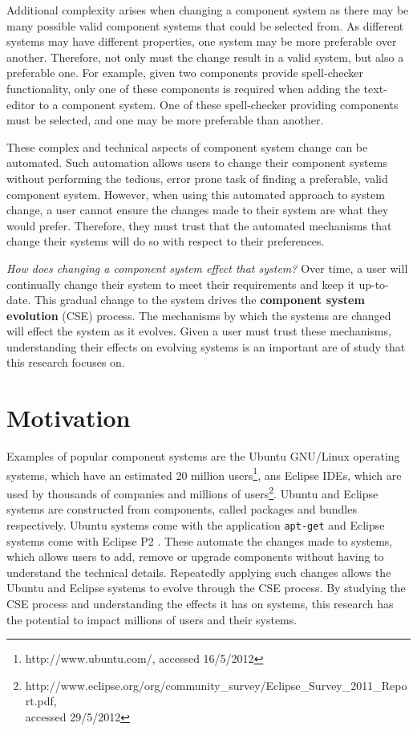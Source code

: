 Additional complexity arises when changing a component system as there may be many possible valid component systems that could be selected from.
As different systems may have different properties, one system may be more preferable over another.
Therefore, not only must the change result in a valid system, but also a preferable one.  
For example, given two components provide spell-checker functionality, 
only one of these components is required when adding the text-editor to a component system.
One of these spell-checker providing components must be selected, and one may be more preferable than another.  

These complex and technical aspects of component system change can be automated. 
Such automation allows users to change their component systems without performing the tedious, error prone task of finding a preferable, valid component system.
However, when using this automated approach to system change, a user cannot ensure the changes made to their system are what they would prefer.
Therefore, they must trust that the automated mechanisms that change their systems will do so with respect to their preferences.

\textit{How does changing a component system effect that system?}
Over time, a user will continually change their system to meet their requirements and keep it up-to-date.
This gradual change to the system drives the \textbf{component system evolution} (CSE) process.
The mechanisms by which the systems are changed will effect the system as it evolves.
Given a user must trust these mechanisms, understanding their effects on evolving systems is an important are of study that this research focuses on.

\section{Motivation}
Examples of popular component systems are the Ubuntu GNU/Linux operating systems, which have an estimated 20 million users\footnote{http://www.ubuntu.com/, accessed 16/5/2012},
ans Eclipse IDEs, which are used by thousands of companies and millions of users\footnote{http://www.eclipse.org/org/community\_survey/Eclipse\_Survey\_2011\_Report.pdf, \\accessed 29/5/2012}.
Ubuntu and Eclipse systems are constructed from components, called packages and bundles respectively. 
Ubuntu systems come with the application \texttt{apt-get} \citep{Barth2005} and Eclipse systems come with Eclipse P2 \citep{leBerre2010}.
These automate the changes made to systems, which allows users to add, remove or upgrade components without having to understand the technical details.
Repeatedly applying such changes allows the Ubuntu and Eclipse systems to evolve through the CSE process.
By studying the CSE process and understanding the effects it has on systems, this research has the potential to impact millions of users and their systems.

